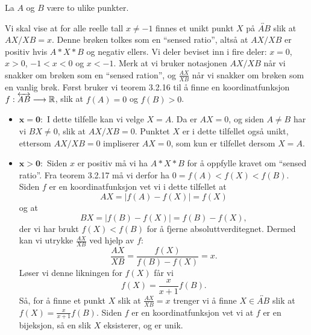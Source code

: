 \begin{oppgave}[5.6.14]
    La $A$ og $B$ være to ulike punkter. 
    \begin{punkt}
        Vi skal vise at for alle reelle tall $x\neq -1$ finnes et unikt punkt $X$ på $\overleftrightarrow{AB}$ slik at $AX/XB=x$.
        Denne brøken tolkes som en ``sensed ratio'', altså at $AX/XB$ er positiv hvis $A\ast X\ast B$ og negativ ellers. 
        Vi deler beviset inn i fire deler: $x=0$, $x>0$, $-1<x<0$ og $x<-1$. 
        Merk at vi bruker notasjonen $AX/XB$ når vi snakker om brøken som en ``sensed ration'', og $\frac{AX}{XB}$ når vi snakker om brøken som en vanlig brøk. 
        Først bruker vi teorem 3.2.16 til å finne en koordinatfunksjon $f:\overleftrightarrow{AB}\longrightarrow \mathbb{R}$, slik at $f(A)=0$ og $f(B)>0$. 

        \begin{itemize}
            \item $\mathbf{x=0:}$
            I dette tilfelle kan vi velge $X=A$. Da er $AX=0$, og siden $A\neq B$ har vi $BX\neq 0$, slik at $AX/XB=0$. 
            Punktet $X$ er i dette tilfellet også unikt, ettersom $AX/XB=0$ impliserer $AX=0$, som kun er tilfellet dersom $X=A$. 
            
            \item $\mathbf{x>0:}$
            Siden $x$ er positiv må vi ha $A\ast X\ast B$ for å oppfylle kravet om ``sensed ratio''. 
            Fra teorem 3.2.17 må vi derfor ha $0=f(A)<f(X)<f(B)$. 
            Siden $f$ er en koordinatfunksjon vet vi i dette tilfellet at 
            $$AX=|f(A)-f(X)|=f(X)$$
            og at 
            $$BX=|f(B)-f(X)|=f(B)-f(X),$$
            der vi har brukt $f(X)<f(B)$ for å fjerne absoluttverditegnet. 
            Dermed kan vi utrykke $\frac{AX}{XB}$ ved hjelp av $f$:
            $$\frac{AX}{XB}=\frac{f(X)}{f(B)-f(X)}=x.$$
            Løser vi denne likningen for $f(X)$ får vi 
            $$f(X)=\frac{x}{x+1}f(B).$$
            Så, for å finne et punkt $X$ slik at $\frac{AX}{XB}=x$ trenger vi å finne $X\in \overleftrightarrow{AB}$ slik at $f(X)=\frac{x}{x+1}f(B)$.
            Siden $f$ er en koordinatfunksjon vet vi at $f$ er en bijeksjon, så en slik $X$ eksisterer, og er unik. 
            

\end{itemize}
\end{punkt}
\end{oppgave}
